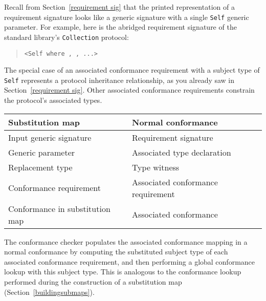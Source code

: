 \documentclass[../generics]{subfiles}
\begin{document}
Recall from Section~\ref{requirement sig} that the printed representation of a requirement signature looks like a generic signature with a single \texttt{Self} generic parameter. For example, here is the abridged requirement signature of the standard library's \texttt{Collection} protocol:
\begin{quote}
\texttt{<Self where , , ...>}
\end{quote}
The special case of an associated conformance requirement with a subject type of \texttt{Self} represents a protocol inheritance relationship, as you already saw in Section~\ref{requirement sig}. Other associated conformance requirements constrain the protocol's associated types.

\begin{table}\label{substitution map conformance duality}
\begin{center}
\begin{tabular}{ll}
\toprule
\textbf{Substitution map}&\textbf{Normal conformance}\\
\midrule
Input generic signature&Requirement signature\\
Generic parameter&Associated type declaration\\
Replacement type&Type witness\\
Conformance requirement&Associated conformance requirement\\
Conformance in substitution map&Associated conformance\\
\bottomrule
\end{tabular}
\end{center}
\end{table}

The conformance checker populates the associated conformance mapping in a normal conformance by computing the substituted subject type of each associated conformance requirement, and then performing a global conformance lookup with this subject type. This is analogous to the conformance lookup performed during the construction of a substitution map (Section~\ref{buildingsubmaps}).
\end{document}
